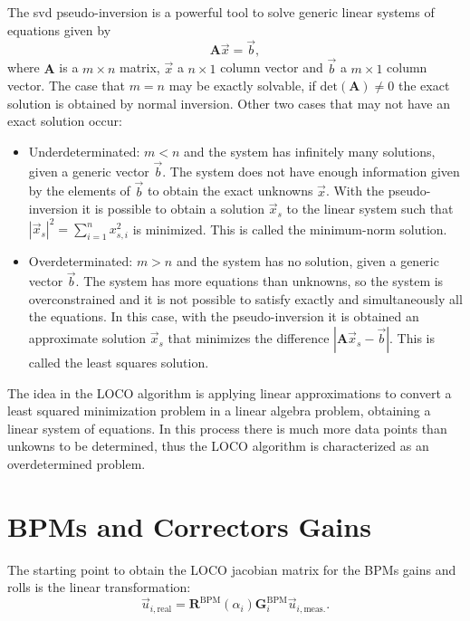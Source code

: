 The \gls{svd} pseudo-inversion is a powerful tool to solve generic linear systems of equations given by
\begin{equation}
    \mathbf{A} \vec{x} = \vec{b},
    \label{eq:linear_system}
\end{equation}
where $\mathbf{A}$ is a $m \times n$ matrix, $\vec{x}$ a $n \times 1$ column vector and $\vec{b}$ a $m \times 1$ column vector. The case that $m=n$ may be exactly solvable, if $\mathrm{det}\left(\mathbf{A}\right) \neq 0$ the exact solution is obtained by normal inversion. Other two cases that may not have an exact solution occur:
\begin{itemize}
    \item Underdeterminated: $m < n$ and the system has infinitely many solutions, given a generic vector $\vec{b}$. The system does not have enough information given by the elements of $\vec{b}$ to obtain the exact unknowns $\vec{x}$. With the pseudo-inversion it is possible to obtain a solution $\vec{x}_s$ to the linear system such that $|\vec{x}_s|^2 = \sum_{i=1}^{n}x^2_{s, i}$ is minimized. This is called the minimum-norm solution.
    \item Overdeterminated: $m > n$ and the system has no solution, given a generic vector $\vec{b}$. The system has more equations than unknowns, so the system is overconstrained and it is not possible to satisfy exactly and simultaneously all the equations. In this case, with the pseudo-inversion it is obtained an approximate solution $\vec{x}_s$ that minimizes the difference $|\mathbf{A}\vec{x}_s - \vec{b}|$. This is called the least squares solution.
\end{itemize}

The idea in the LOCO algorithm is applying linear approximations to convert a least squared minimization problem in a linear algebra problem, obtaining a linear system of equations. In this process there is much more data points than unkowns to be determined, thus the LOCO algorithm is characterized as an overdetermined problem.

\chapter{BPMs and Correctors Gains}\label{appendix:gains}

The starting point to obtain the LOCO jacobian matrix for the BPMs gains and rolls is the linear transformation:
\begin{equation}
    \vec{u}_{i, \mathrm{real}} = \mathbf{R}^{\mathrm{BPM}}\left(\alpha_i\right) \mathbf{G}_{i}^{\mathrm{BPM}} \vec{u}_{i, \mathrm{meas.}}.
    \label{eq:gain_bpm_app}
\end{equation}

